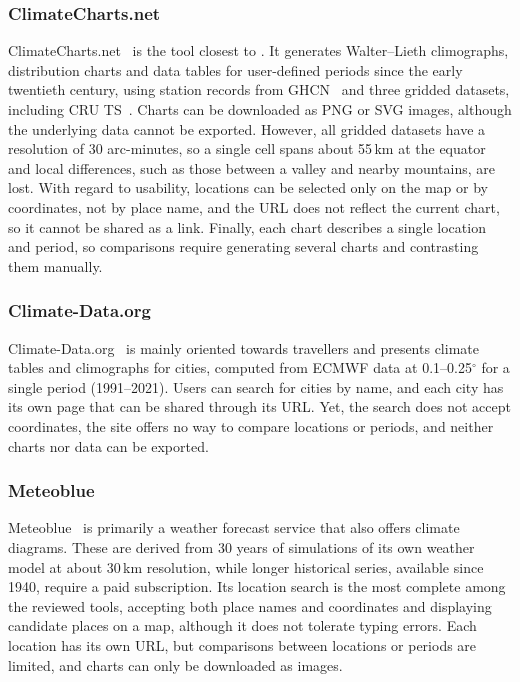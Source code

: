 \subsubsection{ClimateCharts.net}\label{sec:related:existing-tools:climate-charts}
ClimateCharts.net~\cite{zepner2021climatecharts} is the tool closest to \webappname{}.
It generates Walter--Lieth climographs, distribution charts and data tables for
user-defined periods since the early twentieth century, using station records from
GHCN~\cite{lawrimore2011ghcnm} and three gridded datasets, including
CRU TS~\cite{harris2020version}. Charts can be downloaded as PNG or SVG images,
although the underlying data cannot be exported. However, all gridded datasets have a resolution of
30 arc-minutes, so a single cell spans about 55\,km at the equator and local differences,
such as those between a valley and nearby mountains, are lost. With regard to usability,
locations can be selected only on the map or by coordinates, not by place name, and the
URL does not reflect the current chart, so it cannot be shared as a link. Finally, each
chart describes a single location and period, so comparisons require generating several
charts and contrasting them manually.

\subsubsection{Climate-Data.org}\label{sec:related:existing-tools:climate-data}
Climate-Data.org~\cite{climatedataorg} is mainly oriented towards travellers and presents
climate tables and climographs for cities, computed from ECMWF data at
0.1--0.25$^\circ$ for a single period (1991--2021). Users can search for cities by name, 
and each city has its own page that can be shared through its URL. Yet, the search does 
not accept coordinates, the site offers no way to compare locations or periods, and neither 
charts nor data can be exported.

\subsubsection{Meteoblue}\label{sec:related:existing-tools:meteoblue}
Meteoblue~\cite{meteoblue} is primarily a weather forecast service that also offers
climate diagrams. These are derived from 30 years of simulations of its own weather model
at about 30\,km resolution, while longer historical series, available since 1940, require
a paid subscription. Its location search is the most complete among the reviewed tools,
accepting both place names and coordinates and displaying candidate places on a map,
although it does not tolerate typing errors. Each location has its own URL, but
comparisons between locations or periods are limited, and charts can only be
downloaded as images.

